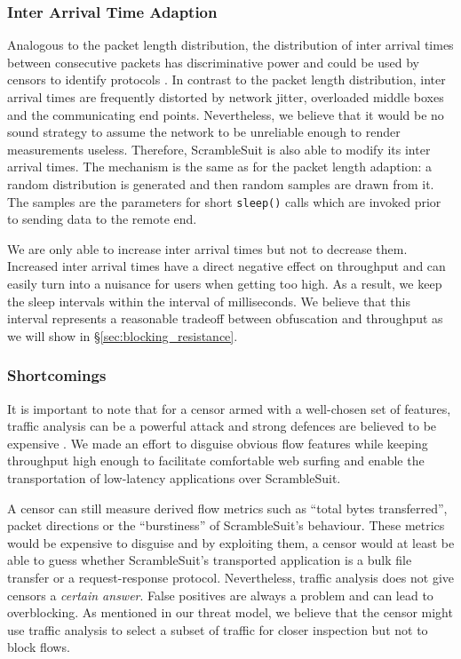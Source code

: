 \documentclass{sig-alternate}
\newcommand{\pt}{\textsf{ScrambleSuit}}
\numberwithin{enumi}{section}
\numberwithin{notesctr}{section}
\begin{document}
{\subsubsection{Inter Arrival Time Adaption}
Analogous to the packet length distribution, the distribution of inter arrival times between
consecutive packets has discriminative power and could be used by censors to identify protocols
\cite{Jaber2011}. In contrast to the packet length distribution, inter arrival times are frequently
distorted by network jitter, overloaded middle boxes and the communicating end points. Nevertheless,
we believe that it would be no sound strategy to assume the network to be unreliable enough to
render measurements useless. Therefore, \pt{} is also able to modify its inter arrival times. The
mechanism is the same as for the packet length adaption: a random distribution is generated and then
random samples are drawn from it. The samples are the parameters for short \texttt{sleep()} calls
which are invoked prior to sending data to the remote end.

We are only able to increase inter arrival times but not to decrease them. Increased inter arrival
times have a direct negative effect on throughput and can easily turn into a nuisance for users when
getting too high. As a result, we keep the sleep intervals within the interval of 
milliseconds. We believe that this interval represents a reasonable tradeoff between obfuscation
and throughput as we will show in \S \ref{sec:blocking_resistance}.




\newpage
\subsubsection{Shortcomings}
\label{sec:shortcomings}
It is important to note that for a censor armed with a well-chosen set of features, traffic analysis
can be a powerful attack and strong defences are believed to be expensive \cite{Dyer2012b,Cai2012}.
We made an effort to disguise obvious flow features while keeping throughput high enough to
facilitate comfortable web surfing and enable the transportation of low-latency applications over
\pt{}.

A censor can still measure derived flow metrics such as ``total bytes transferred'', packet
directions or the ``burstiness'' of \pt{}'s behaviour. These metrics would be expensive to disguise
and by exploiting them, a censor would at least be able to guess whether \pt{}'s transported
application is a bulk file transfer or a request-response protocol. Nevertheless, traffic analysis
does not give censors a \emph{certain answer}. False positives are always a problem and can lead to
overblocking. As mentioned in our threat model, we believe that the censor might use traffic
analysis to select a subset of traffic for closer inspection but not to block flows.


}
\end{document}
